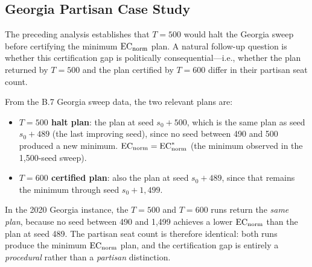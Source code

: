 \begin{center}
\setlength{\fboxsep}{8pt}
\end{center}

\subsection{Georgia Partisan Case Study}
\label{sec:georgia-partisan}

The preceding analysis establishes that $T = 500$ would halt the Georgia sweep
before certifying the minimum $\mathrm{EC}_{\mathrm{norm}}$ plan.
A natural follow-up question is whether this certification gap is politically
consequential---i.e., whether the plan returned by $T = 500$ and the plan
certified by $T = 600$ differ in their partisan seat count.

From the B.7 Georgia sweep data, the two relevant plans are:
\begin{itemize}
  \item \textbf{$T = 500$ halt plan}: the plan at seed $s_0 + 500$, which is
        the same plan as seed $s_0 + 489$ (the last improving seed), since no
        seed between 490 and 500 produced a new minimum.
        $\mathrm{EC}_{\mathrm{norm}} = \mathrm{EC}_{\mathrm{norm}}^*$ (the minimum observed in the 1{,}500-seed sweep).
  \item \textbf{$T = 600$ certified plan}: also the plan at seed $s_0 + 489$,
        since that remains the minimum through seed $s_0 + 1{,}499$.
\end{itemize}

In the 2020 Georgia instance, the $T = 500$ and $T = 600$ runs return the
\emph{same plan}, because no seed between 490 and 1{,}499 achieves a lower
$\mathrm{EC}_{\mathrm{norm}}$ than the plan at seed 489.
The partisan seat count is therefore identical: both runs produce the minimum
$\mathrm{EC}_{\mathrm{norm}}$ plan, and the certification gap is entirely a \emph{procedural}
rather than a \emph{partisan} distinction.

\begin{center}
\setlength{\fboxsep}{8pt}
\end{center}

